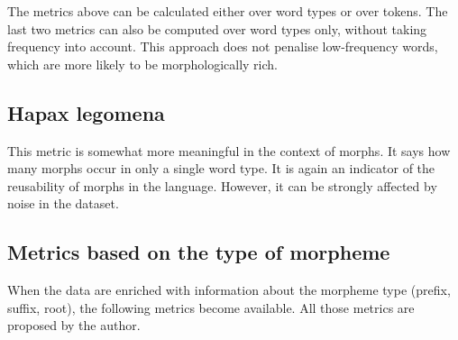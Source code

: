 The metrics above can be calculated either over word types or over tokens. The last two metrics can also be computed over word types only, without taking frequency into account. This approach does not penalise low-frequency words, which are more likely to be morphologically rich.

\subsection{Hapax legomena}
This metric is somewhat more meaningful in the context of morphs. It says how many morphs occur in only a single word type. It is again an indicator of the reusability of morphs in the language. However, it can be strongly affected by noise in the dataset.

\subsection{Metrics based on the type of morpheme}

When the data are enriched with information about the morpheme type (prefix, suffix, root), the following metrics become available. All those metrics are proposed by the author.

